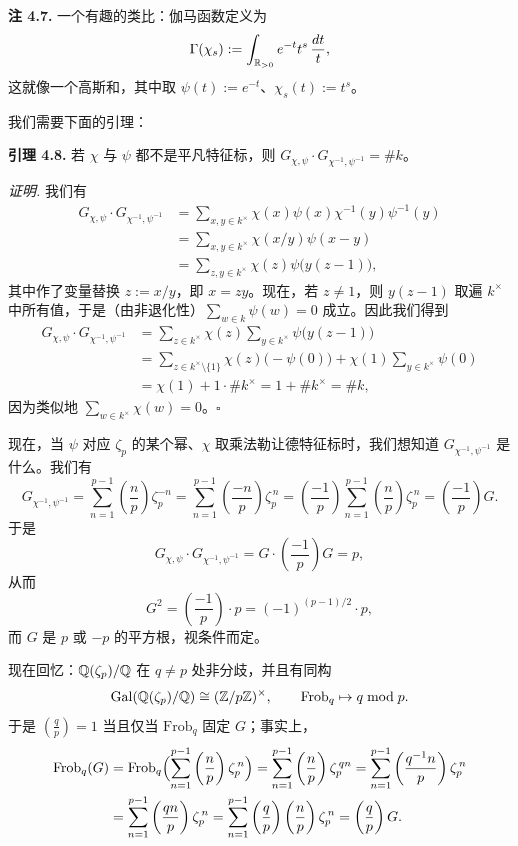 \textbf{注 4.7.} 一个有趣的类比：伽马函数定义为
\[
\Gamma(\chi_s):=\int_{\mathbb{R}_{>0}}e^{-t}t^{s}\,\frac{dt}{t},
\]
这就像一个高斯和，其中取 $\psi(t):=e^{-t}$、$\chi_s(t):=t^{s}$。

我们需要下面的引理：

\textbf{引理 4.8.} 若 $\chi$ 与 $\psi$ 都不是平凡特征标，则 $G_{\chi,\psi}\cdot G_{\chi^{-1},\psi^{-1}}=\#k$。

\textit{证明.} 我们有
\[
\begin{aligned}
G_{\chi,\psi}\cdot G_{\chi^{-1},\psi^{-1}}
&=\sum_{x,y\in k^{\times}}\chi(x)\psi(x)\chi^{-1}(y)\psi^{-1}(y)\\
&=\sum_{x,y\in k^{\times}}\chi(x/y)\psi(x-y)\\
&=\sum_{z,y\in k^{\times}}\chi(z)\psi\bigl(y(z-1)\bigr),
\end{aligned}
\]
其中作了变量替换 $z:=x/y$，即 $x=zy$。现在，若 $z\neq 1$，则 $y(z-1)$ 取遍 $k^{\times}$ 中所有值，于是（由非退化性）$\sum_{w\in k}\psi(w)=0$ 成立。因此我们得到
\[
\begin{aligned}
G_{\chi,\psi}\cdot G_{\chi^{-1},\psi^{-1}}
&=\sum_{z\in k^{\times}}\chi(z)\sum_{y\in k^{\times}}\psi\bigl(y(z-1)\bigr)\\
&=\sum_{z\in k^{\times}\setminus\{1\}}\chi(z)\bigl(-\psi(0)\bigr)+\chi(1)\sum_{y\in k^{\times}}\psi(0)\\
&=\chi(1)+1\cdot\#k^{\times}=1+\#k^{\times}=\#k,
\end{aligned}
\]
因为类似地 $\sum_{w\in k^{\times}}\chi(w)=0$。\hfill$\square$

现在，当 $\psi$ 对应 $\zeta_p$ 的某个幂、$\chi$ 取乘法勒让德特征标时，我们想知道 $G_{\chi^{-1},\psi^{-1}}$ 是什么。我们有
\[
G_{\chi^{-1},\psi^{-1}}=\sum_{n=1}^{p-1}\left(\frac{n}{p}\right)\zeta_p^{-n}
=\sum_{n=1}^{p-1}\left(\frac{-n}{p}\right)\zeta_p^{\,n}
=\left(\frac{-1}{p}\right)\sum_{n=1}^{p-1}\left(\frac{n}{p}\right)\zeta_p^{\,n}
=\left(\frac{-1}{p}\right)G .
\]
于是
\[
G_{\chi,\psi}\cdot G_{\chi^{-1},\psi^{-1}}=G\cdot\left(\frac{-1}{p}\right)G=p,
\]
从而
\[
G^2=\left(\frac{-1}{p}\right)\cdot p=(-1)^{(p-1)/2}\cdot p,
\]
而 $G$ 是 $p$ 或 $-p$ 的平方根，视条件而定。

现在回忆：$\mathbb{Q}(\zeta_p)/\mathbb{Q}$ 在 $q\neq p$ 处非分歧，并且有同构
\[
\operatorname{Gal}(\mathbb{Q}(\zeta_p)/\mathbb{Q})\cong(\mathbb{Z}/p\mathbb{Z})^{\times},\qquad \mathrm{Frob}_q\mapsto q \bmod p .
\]
于是 $\left(\frac{q}{p}\right)=1$ 当且仅当 $\mathrm{Frob}_q$ 固定 $G$；事实上，
\[
\begin{aligned}
\mathrm{Frob}_q(G)
&=\mathrm{Frob}_q\Bigl(\sum_{n=1}^{p-1}\left(\frac{n}{p}\right)\zeta_p^{\,n}\Bigr)
=\sum_{n=1}^{p-1}\left(\frac{n}{p}\right)\zeta_p^{\,qn}
=\sum_{n=1}^{p-1}\left(\frac{q^{-1}n}{p}\right)\zeta_p^{\,n}\\
&=\sum_{n=1}^{p-1}\left(\frac{qn}{p}\right)\zeta_p^{\,n}
=\sum_{n=1}^{p-1}\left(\frac{q}{p}\right)\left(\frac{n}{p}\right)\zeta_p^{\,n}
=\left(\frac{q}{p}\right)G .
\end{aligned}
\]

